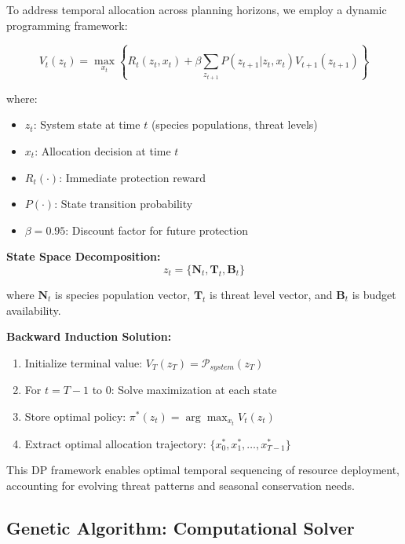To address temporal allocation across planning horizons, we employ a dynamic programming framework:

\begin{equation}
V_t(z_t) = \max_{x_t} \left\{ R_t(z_t, x_t) + \beta \sum_{z_{t+1}} P(z_{t+1} | z_t, x_t) V_{t+1}(z_{t+1}) \right\}
\label{eq:dp_bellman}
\end{equation}

where:
\begin{itemize}
    \item $z_t$: System state at time $t$ (species populations, threat levels)
    \item $x_t$: Allocation decision at time $t$
    \item $R_t(\cdot)$: Immediate protection reward
    \item $P(\cdot)$: State transition probability
    \item $\beta = 0.95$: Discount factor for future protection
\end{itemize}

\textbf{State Space Decomposition:}
\begin{equation}
z_t = \{ \mathbf{N}_t, \mathbf{T}_t, \mathbf{B}_t \}
\label{eq:state_space}
\end{equation}

where $\mathbf{N}_t$ is species population vector, $\mathbf{T}_t$ is threat level vector, and $\mathbf{B}_t$ is budget availability.

\textbf{Backward Induction Solution:}
\begin{enumerate}
    \item Initialize terminal value: $V_T(z_T) = \mathcal{P}_{system}(z_T)$
    \item For $t = T-1$ to $0$: Solve maximization at each state
    \item Store optimal policy: $\pi^*(z_t) = \arg\max_{x_t} V_t(z_t)$
    \item Extract optimal allocation trajectory: $\{x_0^*, x_1^*, \ldots, x_{T-1}^*\}$
\end{enumerate}

This DP framework enables optimal temporal sequencing of resource deployment, accounting for evolving threat patterns and seasonal conservation needs.

\subsection{Genetic Algorithm: Computational Solver}

